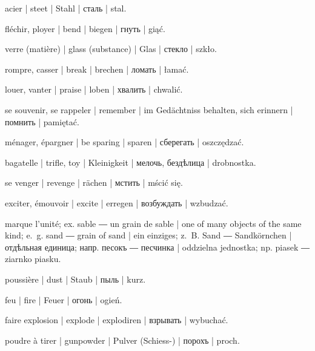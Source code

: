 \begin{ekzvocab}{1em}
 acier | steet | Stahl | сталь | stal.

 fléchir, ployer | bend | biegen | гнуть | giąć.

 verre (matière) | glass (substance) | Glas | стекло | szkło.

 rompre, casser | break | brechen | ломать | łamać.

 louer, vanter | praise | loben | хвалить | chwalić.

 se souvenir, se rappeler | remember | im Gedächtniss behalten, sich erinnern | помнить | pamiętać.

 ménager, épargner | be sparing | sparen | сберегать | oszczędzać.

 bagatelle | trifle, toy | Kleinigkeit | мелочь, бездѣлица | drobnostka.

 se venger | revenge | rächen | мстить | mścić się.

 exciter, émouvoir | excite | erregen | возбуждать | wzbudzać.

 marque l’unité; ex.  sable ―  un grain de sable | one of many objects of the same kind; e.~g.  sand ―  grain of sand | ein einziges; z.~B.  Sand ―  Sandkörnchen | отдѣльная единица; напр.  песокъ ―  песчинка | oddzielna jednostka; np.  piasek ―  ziarnko piasku.

 poussière | dust | Staub | пыль | kurz.

 feu | fire | Feuer | огонь | ogień.

 faire explosion | explode | explodiren | взрывать | wybuchać.

 poudre à tirer | gunpowder | Pulver (Schiess-) | порохъ | proch.

\end{ekzvocab}



